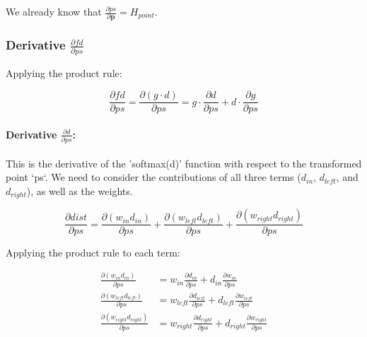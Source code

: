 \documentclass[11pt]{article}
\begin{document}
                We already know that $\frac{\partial ps}{\partial \mathbf{p}} = H_{point}$.

            \subsubsection*{Derivative $\frac{\partial fd}{\partial ps}$}

                Applying the product rule:

                \begin{equation}
                    \frac{\partial fd}{\partial ps} = \frac{\partial (g \cdot d)}{\partial ps} =  g \cdot \frac{\partial d}{\partial ps}  + d \cdot  \frac{\partial g}{\partial ps}
                \end{equation}

                \paragraph{Derivative $\frac{\partial d}{\partial ps}$:}

                This is the derivative of the 'softmax(d)' function with respect to the transformed point `ps`.
                We need to consider the contributions of all three terms ($d_{in}$, $d_{left}$, and $d_{right}$), as well as the weights.

                \begin{equation}
                    \frac{\partial dist}{\partial ps} = \frac{\partial (w_{in} d_{in})}{\partial ps} + \frac{\partial (w_{left} d_{left})}{\partial ps} + \frac{\partial (w_{right} d_{right})}{\partial ps}
                \end{equation}

                Applying the product rule to each term:

                \begin{align}
                    \frac{\partial (w_{in} d_{in})}{\partial ps} &= w_{in} \frac{\partial d_{in}}{\partial ps} + d_{in} \frac{\partial w_{in}}{\partial ps} \\
                    \frac{\partial (w_{left} d_{left})}{\partial ps} &= w_{left} \frac{\partial d_{left}}{\partial ps} + d_{left} \frac{\partial w_{left}}{\partial ps} \\
                    \frac{\partial (w_{right} d_{right})}{\partial ps} &= w_{right} \frac{\partial d_{right}}{\partial ps} + d_{right} \frac{\partial w_{right}}{\partial ps}
                \end{align}
\end{document}
